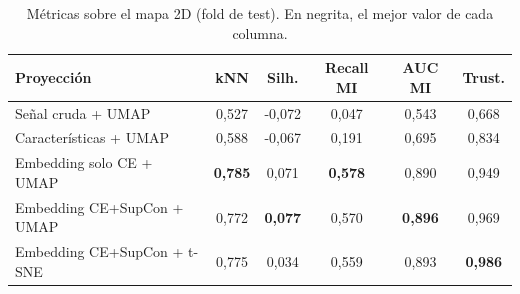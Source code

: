 \begin{table}[t]
\centering
\caption{Métricas sobre el mapa 2D (fold de test). En negrita, el mejor valor de cada columna.}
\label{tab:proyecciones}
\scriptsize
\setlength{\tabcolsep}{3pt}
\begin{tabular}{lccccc}
\toprule
Proyección & kNN & Silh. & Recall MI & AUC MI & Trust. \\
\midrule
Señal cruda + UMAP & 0,527 & -0,072 & 0,047 & 0,543 & 0,668 \\
Características + UMAP & 0,588 & -0,067 & 0,191 & 0,695 & 0,834 \\
Embedding solo CE + UMAP & \textbf{0,785} & 0,071 & \textbf{0,578} & 0,890 & 0,949 \\
Embedding CE+SupCon + UMAP & 0,772 & \textbf{0,077} & 0,570 & \textbf{0,896} & 0,969 \\
Embedding CE+SupCon + t-SNE & 0,775 & 0,034 & 0,559 & 0,893 & \textbf{0,986} \\
\bottomrule
\end{tabular}
\end{table}
